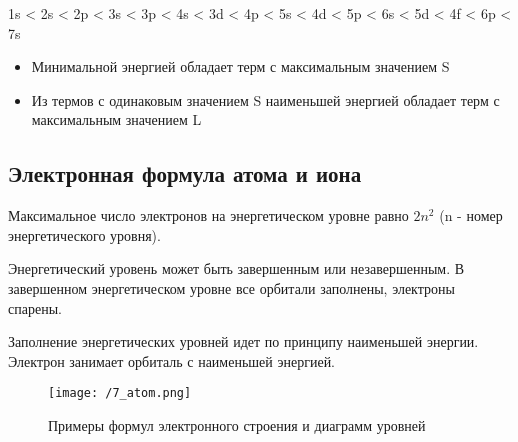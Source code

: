 1s < 2s < 2p < 3s < 3p < 4s < 3d < 4p < 5s < 4d < 5p < 6s < 5d < 4f < 6p < 7s

 
 \begin{itemize}
     \item Минимальной энергией обладает терм с максимальным значением S
     \item Из термов с одинаковым значением S наименьшей энергией обладает терм с максимальным значением L
 \end{itemize}
 
 \subsection{Электронная формула атома и иона}
 
 Максимальное число электронов на энергетическом уровне равно $2n^2$ (n - номер энергетического уровня).
 
 Энергетический уровень может быть завершенным или незавершенным. В завершенном энергетическом уровне все орбитали заполнены, электроны спарены.

Заполнение энергетических уровней идет по принципу наименьшей энергии. Электрон занимает орбиталь с наименьшей энергией.

\begin{figure}[H]
    \centering
    \texttt{[image: /7\_atom.png]}
    \caption{Примеры формул электронного строения и диаграмм уровней}
    \label{fig:7atom}
\end{figure}

